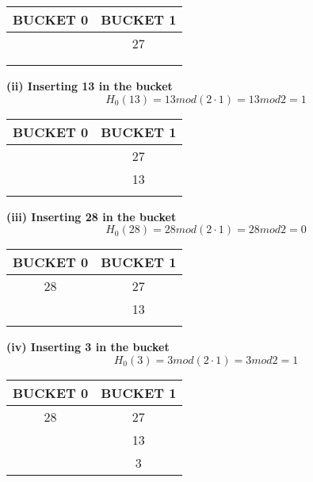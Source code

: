 \begin{center}
\begin{tabular}{ |c|c| } 
 \hline
  \textbf{\color{red}{P}} BUCKET 0 & BUCKET 1 \\ [0.5ex] 
 \hline\hline
 \hline
   & 27 \\ 
   &    \\
   &    \\
 \hline
\end{tabular}
\end{center}
\textbf{(ii) Inserting 13 in the bucket}
\[H_0(13) = 13 mod (2 \cdot 1)  = 13 mod 2 = 1\] 

\begin{center}
\begin{tabular}{ |c|c| } 
 \hline
 \textbf{\color{red}{P}} BUCKET 0 & BUCKET 1 \\ [0.5ex] 
 \hline\hline
 \hline
   & 27 \\ 
   & 13 \\
   &    \\
   \hline
\end{tabular}
\end{center}

\newpage

\textbf{(iii) Inserting 28 in the bucket}
\[H_0(28) = 28 mod (2 \cdot 1)  = 28 mod 2 = 0\] 

\begin{center}
\begin{tabular}{ |c|c| } 
 \hline
 \textbf{\color{red}{P}} BUCKET 0 & BUCKET 1 \\ [0.5ex] 
 \hline\hline
 \hline
  28 & 27 \\ 
   & 13   \\
   &      \\
 \hline
\end{tabular}
\end{center}

\textbf{(iv) Inserting 3 in the bucket}
\[H_0(3) = 3 mod (2 \cdot 1)  = 3 mod 2 = 1\] 

\begin{center}
\begin{tabular}{ |c|c| } 
 \hline
 \textbf{\color{red}{P}} BUCKET 0 & BUCKET 1 \\ [0.5ex] 
 \hline\hline
 \hline
  28 & 27 \\ 
   & 13   \\
   & 3 \\
 \hline
\end{tabular}
\end{center}

